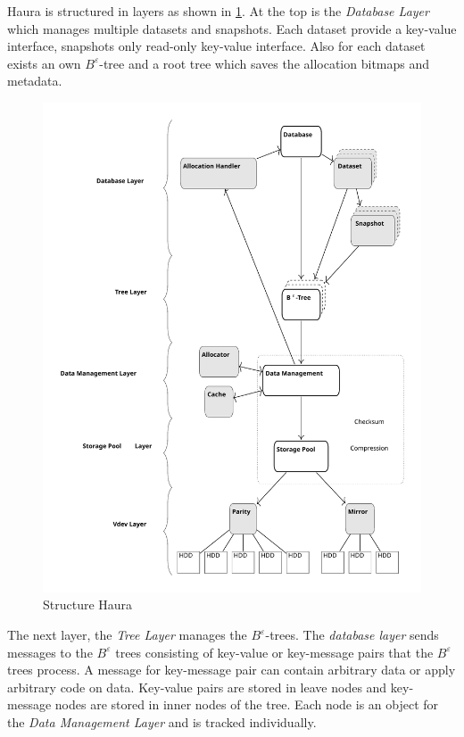 \documentclass[
	12pt,
	a4paper,
	abstract,
	bibliography=totoc,
	chapterprefix,
	headings=openright,
	numbers=endperiod,
	parskip=half,
	twoside,
]{scrreprt}
\begin{document}
Haura is structured in layers as shown in \cref{fig:structure Haura}.
At the top is the \emph{Database Layer} which manages multiple datasets and snapshots. 
Each dataset provide a key-value interface, snapshots only read-only key-value interface. 
Also for each dataset exists an own $B^{\varepsilon}$-tree and  a root tree which saves the allocation bitmaps and metadata.

\begin{figure}[ht]
	\centering
	\includegraphics[scale=0.4]{overview_haura_level.pdf}
	\caption{Structure Haura \cite{wiedemann2018modern}}
		\label{fig:structure Haura}
\end{figure}

The next layer, the \emph{Tree Layer} manages the $B^{\varepsilon}$-trees.
The \emph{database layer} sends messages to the $B^{\varepsilon}$ trees consisting of key-value or key-message pairs that 
the $B^{\varepsilon}$ trees process. A message for key-message pair can contain arbitrary data or apply arbitrary code on data.
Key-value pairs are stored in leave nodes and key-message nodes are stored in inner nodes of the tree.
Each node is an object for the \emph{Data Management Layer} and is tracked individually.
\end{document}
